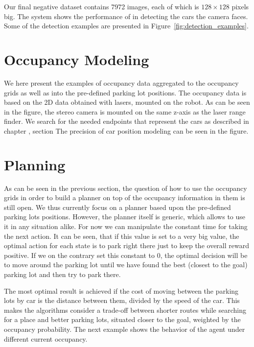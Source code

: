 Our final negative dataset contains 7972 images, each of which is $128 \times
128$ pixels big. The system shows the performance of  in detecting the cars the camera faces. Some of the detection
examples are presented in Figure~\ref{fig:detection_examples}.


\section{Occupancy Modeling}
\label{sec:occupancy_modeling}

We here present the examples of occupancy data aggregated to the occupancy
grids as well as into the pre-defined parking lot positions. The occupancy
data is based on the 2D data obtained with lasers, mounted on the robot.
 As can be seen in the figure, the
stereo camera is mounted on the same z-axis as the laser range finder. We
search for the needed endpoints that represent the cars as described in
chapter , section  The
precision of car position modeling can be seen in the figure.  %

\section{Planning}
\label{sec:planning}

As can be seen in the previous section, the question of how to use the
occupancy grids in order to build a planner on top of the occupancy
information in them is still open. We thus currently focus on a planner based
upon the pre-defined parking lots positions. However, the planner itself is
generic, which allows to use it in any situation alike. For now we can
manipulate the constant time for taking the next action. It can be seen, that
if this value is set to a very big value, the optimal action for each state is
to park right there just to keep the overall reward positive. If we on the
contrary set this constant to 0, the optimal decision will be to move around
the parking lot until we have found the best (closest to the goal) parking lot
and then try to park there.

The most optimal result is achieved if the cost of moving between the parking
lots by car is the distance between them, divided by the speed of the car.
This makes the algorithms consider a trade-off between shorter routes while
searching for a place and better parking lots, situated closer to the goal,
weighted by the occupancy probability. The next example shows the behavior of
the agent under different current occupancy.

